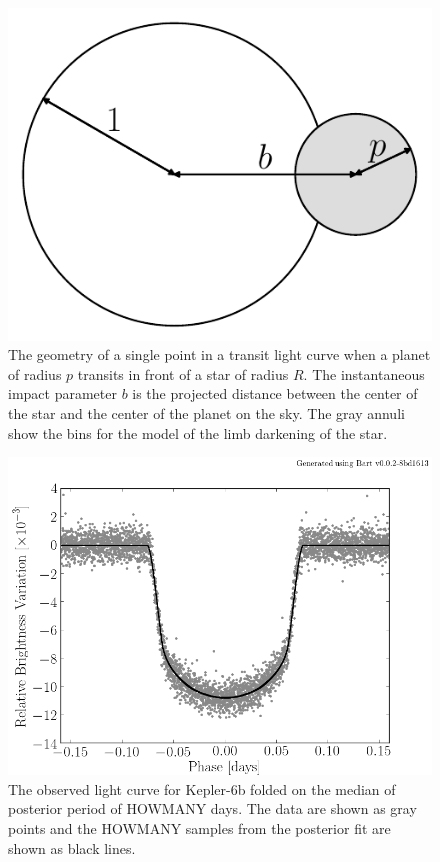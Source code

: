 \documentclass[12pt,preprint]{aastex}
\newcommand{\figlabel}[1]{\label{fig:#1}}
\begin{document}
\begin{figure}[htbp]
    \begin{center}
        \includegraphics[width=\textwidth]{figures/geom.pdf}
    \end{center}
    \caption{The geometry of a single point in a transit light curve when a
        planet of radius $p$ transits in front of a star of radius $R$. The
        instantaneous impact parameter $b$ is the projected distance between
        the center of the star and the center of the planet on the sky. The
        gray annuli show the bins for the model of the limb darkening of the
        star. \figlabel{geom}}
\end{figure}

\begin{figure}[htbp]
    \begin{center}
        \includegraphics[width=\textwidth]{figures/k6-lc.png}
    \end{center}
    \caption{The observed light curve for Kepler-6b folded on the median
        of posterior period of HOWMANY days. The data are shown as gray points
        and the HOWMANY samples from the posterior fit are shown as black
        lines. \figlabel{k6-lc}}
\end{figure}
\end{document}

